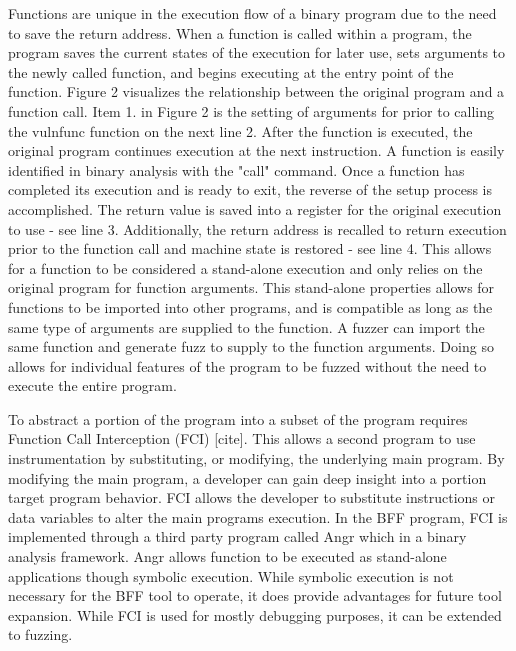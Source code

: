 \documentclass[conference]{IEEEtran}
\begin{document}
Functions are unique in the execution flow of a binary program due to the need to save the return address. When a function is called within a program, the program saves the current states of the execution for later use, sets arguments to the newly called function, and begins executing at the entry point of the function. Figure 2 visualizes the relationship between the original program and a function call. Item 1. in Figure 2 is the setting of arguments for prior to calling the vulnfunc function on the next line 2. After the function is executed, the original program continues execution at the next instruction. A function is easily identified in binary analysis with the "call" command. Once a function has completed its execution and is ready to exit, the reverse of the setup process is accomplished. The return value is saved into a register for the original execution to use - see line 3. Additionally, the return address is recalled to return execution prior to the function call and machine state is restored - see line 4. This allows for a function to be considered a stand-alone execution and only relies on the original program for function arguments. This stand-alone properties allows for functions to be imported into other programs, and is compatible as long as the same type of arguments are supplied to the function. A fuzzer can import the same function and generate fuzz to supply to the function arguments. Doing so allows for individual features of the program to be fuzzed without the need to execute the entire program. 

To abstract a portion of the program into a subset of the program requires Function Call Interception (FCI) [cite]. This allows a second program to use instrumentation by substituting, or modifying, the underlying main program. By modifying the main program, a developer can gain deep insight into a portion target program behavior. FCI allows the developer to substitute instructions or data variables to alter the main programs execution. In the BFF program, FCI is implemented through a third party program called Angr which in a binary analysis framework. Angr allows function to be executed as stand-alone applications though symbolic execution. While symbolic execution is not necessary for the BFF tool to operate, it does provide advantages for future tool expansion.  While FCI is used for mostly debugging purposes, it can be extended to fuzzing.
\end{document}
